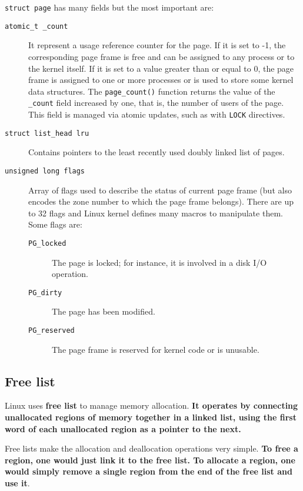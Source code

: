 \documentclass[10pt,a4paper]{article}
\begin{document}
\texttt{struct page} has many fields but the most important are:
\begin{description}

\item[\texttt{atomic\_t \_count}] It represent a usage reference counter for the page. If it is set to -1, the corresponding page frame is free and can be assigned to any process or to the kernel itself. If it is set to a value greater than or equal to 0, the page frame is assigned to one or more processes or is used to store some kernel data structures. The \texttt{page\_count()} function returns the value of the \texttt{\_count} field increased by one, that is, the number of users of the page. This field is managed via atomic updates, such as with \texttt{LOCK} directives.
\item[\texttt{struct list\_head lru}] Contains pointers to the least recently used doubly linked list of pages. 
\item[\texttt{unsigned long flags}] Array of flags used to describe the status of current page frame (but also encodes the zone number to which the page frame belongs). There are up to 32 flags and Linux kernel defines many macros to manipulate them. Some flags are:
\begin{description}
\item[\texttt{PG\_locked}] The page is locked; for instance, it is involved in a disk I/O operation.
\item[\texttt{PG\_dirty}] The page has been modified.
\item[\texttt{PG\_reserved}] The page frame is reserved for kernel code or is unusable.
\end{description}

\end{description}

\subsection{Free list}

Linux uses \textbf{free list} to manage memory allocation. \textbf{It operates by connecting unallocated regions of memory together in a linked list, using the first word of each unallocated region as a pointer to the next.} 

Free lists make the allocation and deallocation operations very simple. \textbf{To free a region, one would just link it to the free list. To allocate a region, one would simply remove a single region from the end of the free list and use it}. 
\end{document}
